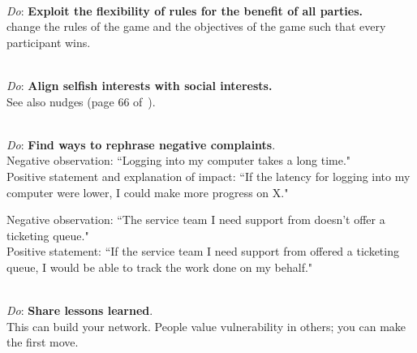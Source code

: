 \ \\
\textit{Do}: \textbf{Exploit the flexibility of rules for the benefit of all parties.}\\
change the rules of the game and the objectives of the game such that every participant wins.

\ \\
\textit{Do}: \textbf{Align selfish interests with social interests.}\\
See also nudges
(page 66 of~\cite{2012_Schneier}).

\ \\
\textit{Do}: \textbf{Find ways to rephrase negative complaints}.\\
Negative observation: ``Logging into my computer takes a long time."\\
Positive statement and explanation of impact: ``If the latency for logging into my computer were lower, I could make more progress on X."


Negative observation: ``The service team I need support from doesn't offer a ticketing queue."\\
Positive statement: ``If the service team I need support from offered a ticketing queue, I would be able to track the work done on my behalf."

\ \\
\textit{Do}: \textbf{Share lessons learned}.\\
This can build your network. People value vulnerability in others; you can make the first move. 